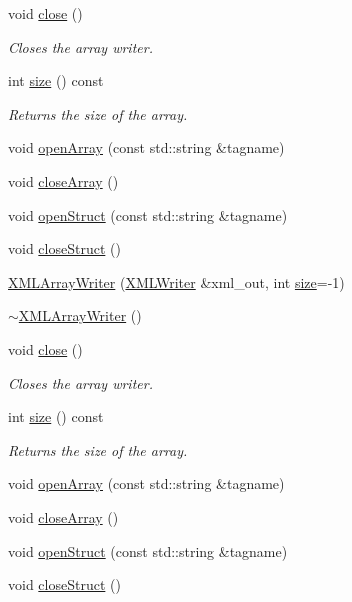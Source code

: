 \begin{DoxyCompactItemize}
\item 
void \mbox{\hyperlink{classADATXML_1_1XMLArrayWriter_a89774ac16fd8636da94745ccba7add0a}{close}} ()
\begin{DoxyCompactList}\small\item\em Closes the array writer. \end{DoxyCompactList}\item 
int \mbox{\hyperlink{classADATXML_1_1XMLArrayWriter_a152ffb3695b1f644614a7ca7ca86efa0}{size}} () const
\begin{DoxyCompactList}\small\item\em Returns the size of the array. \end{DoxyCompactList}\item 
void \mbox{\hyperlink{classADATXML_1_1XMLArrayWriter_aae20d7fa7fe499da36f54ae08b64860e}{open\+Array}} (const std\+::string \&tagname)
\item 
void \mbox{\hyperlink{classADATXML_1_1XMLArrayWriter_a5d6b79a0e8add658220f21e5fc138230}{close\+Array}} ()
\item 
void \mbox{\hyperlink{classADATXML_1_1XMLArrayWriter_af1602cb14d54aa8e42442f2784c00e22}{open\+Struct}} (const std\+::string \&tagname)
\item 
void \mbox{\hyperlink{classADATXML_1_1XMLArrayWriter_a5a849f8851bce99654c44dc08b1fe486}{close\+Struct}} ()
\item 
\mbox{\hyperlink{classADATXML_1_1XMLArrayWriter_a51816af0342b997945b0d21e4ba30c5d}{X\+M\+L\+Array\+Writer}} (\mbox{\hyperlink{classADATXML_1_1XMLWriter}{X\+M\+L\+Writer}} \&xml\+\_\+out, int \mbox{\hyperlink{classADATXML_1_1XMLArrayWriter_a152ffb3695b1f644614a7ca7ca86efa0}{size}}=-\/1)
\item 
\mbox{\hyperlink{classADATXML_1_1XMLArrayWriter_ac1e9df12a7df4c52d6026c3b814abf65}{$\sim$\+X\+M\+L\+Array\+Writer}} ()
\item 
void \mbox{\hyperlink{classADATXML_1_1XMLArrayWriter_a89774ac16fd8636da94745ccba7add0a}{close}} ()
\begin{DoxyCompactList}\small\item\em Closes the array writer. \end{DoxyCompactList}\item 
int \mbox{\hyperlink{classADATXML_1_1XMLArrayWriter_a152ffb3695b1f644614a7ca7ca86efa0}{size}} () const
\begin{DoxyCompactList}\small\item\em Returns the size of the array. \end{DoxyCompactList}\item 
void \mbox{\hyperlink{classADATXML_1_1XMLArrayWriter_aae20d7fa7fe499da36f54ae08b64860e}{open\+Array}} (const std\+::string \&tagname)
\item 
void \mbox{\hyperlink{classADATXML_1_1XMLArrayWriter_a5d6b79a0e8add658220f21e5fc138230}{close\+Array}} ()
\item 
void \mbox{\hyperlink{classADATXML_1_1XMLArrayWriter_af1602cb14d54aa8e42442f2784c00e22}{open\+Struct}} (const std\+::string \&tagname)
\item 
void \mbox{\hyperlink{classADATXML_1_1XMLArrayWriter_a5a849f8851bce99654c44dc08b1fe486}{close\+Struct}} ()
\end{DoxyCompactItemize}
